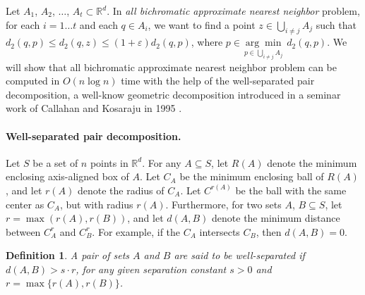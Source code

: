 \documentclass{article}
\newtheorem{definition}{Definition}
\newcommand{\ignore}[1]{}
\begin{document}
Let  $A_1$, $A_2$, $\dots$, $A_t \subset \mathbb{R}^d$. In {\it all bichromatic approximate nearest neighbor} problem, for each $i = 1 \dots t$ and each $q \in A_i$, we want to find 
a point $ z \in \bigcup \limits_{i \neq j} A_j$ such that $d_2(q,p)\le d_2(q,z) \le (1+\varepsilon) d_2(q, p)$, where 
$
	p \in \underset{{p \in \bigcup \limits_{i \neq j} A_j}}{\arg \min }\;  d_2 \left(q, p\right).
$
We will show that all bichromatic approximate nearest neighbor problem can be computed in $O(n\log n)$ time with the 
help of the well-separated pair decomposition, a well-know geometric decomposition introduced in a seminar work of 
Callahan and Kosaraju in 1995 \cite{callahan95-phd, callahan95}.

\paragraph{Well-separated pair decomposition.} Let $S$ be a set of $n$ points in $\mathbb{R}^d$. For any $A \subseteq S$, let $R(A)$ denote the minimum enclosing axis-aligned box of $A$.  Let $C_A$ be the minimum enclosing ball of $R(A)$, and let 
$r(A)$ denote the radius of $C_A$.  Let $C^{r(A)}$ be the ball with the same center as 
$C_A$, but with radius $r(A)$.  Furthermore, for two sets $A$, $B \subseteq S$, let $r = \max(r(A), r(B))$, and let $d(A, B)$ denote the minimum distance between $C^{r}_A$ and $C^{r}_B$.  For example, if the $C_A$ intersects $C_B$, then $d(A,B) = 0$.

\begin{definition}
A pair of sets $A$ and $B$ are said to be well-separated if $d(A, B) > s \cdot r$, for 
any given separation constant $s>0$ and $r = \max\{r(A), r(B)\}$. 
\end{definition}

\ignore{
\begin{figure}
  \centering
  \texttt{[image: figures/dumbell.png]} 
  \caption{An example of a dumbbell for a pair of sets $(A, B)$. }
  \label{fig:fig1}
\end{figure}
}%
 
\end{document}
